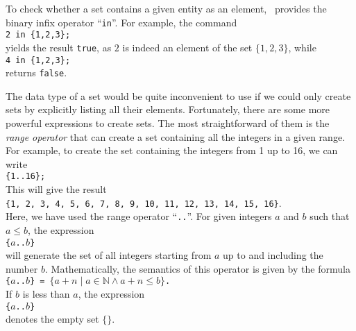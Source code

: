 To check whether a set contains a given entity as an element, \setlx\ provides the binary infix
operator ``\texttt{in}''.  For example, the command
\\[0.2cm]
\hspace*{1.3cm}
\texttt{2 in \{1,2,3\};}
\\[0.2cm]
yields the result \texttt{true}, as $2$ is indeed an element of the set $\{1,2,3\}$, while 
\\[0.2cm]
\hspace*{1.3cm}
\texttt{4 in \{1,2,3\};}
\\[0.2cm]
 returns \texttt{false}.

The data type of a set would be quite inconvenient to use if we could only create sets by
explicitly listing all their elements.  Fortunately, there are some more powerful expressions to
create sets.  The most straightforward of them is the \emph{range operator} that can create a set
containing all the integers in a given range.  For example, to create the set containing
the integers from 1 up to 16, we can write 
\\[0.2cm]
\hspace*{1.3cm}
\texttt{\{1..16\};}
\\[0.2cm]
This will give the result
\\[0.2cm]
\hspace*{1.3cm}
\texttt{\{1, 2, 3, 4, 5, 6, 7, 8, 9, 10, 11, 12, 13, 14, 15, 16\}}.
\\[0.2cm]
Here, we have used the range operator ``\texttt{..}''.  For given integers $a$ and $b$
such that $a \leq b$,
the expression
\\[0.2cm]
\hspace*{1.3cm}
\texttt{\{$a$..$b$\}}
\\[0.2cm]
will generate the set of all integers starting from $a$ up to and including the number
$b$.  Mathematically, the semantics of this operator is  given by the formula
\\[0.2cm]
\hspace*{1.3cm}
\texttt{\{$a$..$b$\} = $\{ a + n \mid a \in \mathbb{N} \wedge a + n \leq b\}$.}
\\[0.2cm]
If $b$ is less than $a$, the expression 
\\[0.2cm]
\hspace*{1.3cm}
\texttt{\{$a$..$b$\}}
\\[0.2cm]
denotes the empty set $\{\}$.

